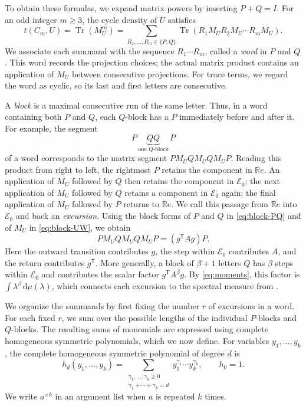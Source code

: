 \documentclass[11pt]{article}
\numberwithin{equation}{section}
\newcommand{\R}{\mathbb R}
\newcommand{\Tr}{\operatorname{Tr}}
\newcommand{\dd}{\,\mathrm d}
\newcommand{\tC}[2]{t(C_{#1},#2)}
\newcommand{\rep}[2]{#1^{\times #2}}
\begin{document}
To obtain these formulas, we expand matrix powers by inserting $P+Q=I$.
For an odd integer $m\ge3$, the cycle density of $U$ satisfies
\begin{equation}\label{eq:trace-projection-expansion}
  \tC mU=\Tr(M_U^m)
  =\sum_{R_1,\ldots,R_m\in\{P,Q\}}
    \Tr(R_1M_UR_2M_U\cdots R_mM_U).
\end{equation}
We associate each summand with the sequence $R_1\cdots R_m$, called a \emph{word} in $P$ and $Q$.
This word records the projection choices; the actual matrix product contains an application of $M_U$ between consecutive projections.
For trace terms, we regard the word as cyclic, so its last and first letters are consecutive.

A \emph{block} is a maximal consecutive run of the same letter.
Thus, in a word containing both $P$ and $Q$, each $Q$-block has a $P$ immediately before and after it.
For example, the segment
\[
  P\,\underbrace{QQ}_{\text{one $Q$-block}}\,P
\]
of a word corresponds to the matrix segment $P M_U Q M_U Q M_U P$.
Reading this product from right to left, the rightmost $P$ retains the component in $\R e$.
An application of $M_U$ followed by $Q$ then retains the component in $\mathcal E_0$; the next application of $M_U$ followed by $Q$ retains a component in $\mathcal E_0$ again; the final application of $M_U$ followed by $P$ returns to $\R e$.
We call this passage from $\R e$ into $\mathcal E_0$ and back an \emph{excursion}.
Using the block forms of $P$ and $Q$ in \eqref{eq:block-PQ} and of $M_U$ in \eqref{eq:block-UW}, we obtain
\[
  P M_U Q M_U Q M_U P=(g^{\mathsf T}Ag)P.
\]
Here the outward transition contributes $g$, the step within $\mathcal E_0$ contributes $A$, and the return contributes $g^{\mathsf T}$.
More generally, a block of $\beta+1$ letters $Q$ has $\beta$ steps within $\mathcal E_0$ and contributes the scalar factor $g^{\mathsf T}A^\beta g$.
By \eqref{eq:moments}, this factor is $\int\lambda^\beta\dd\mu(\lambda)$, which connects each excursion to the spectral measure from .

We organize the summands by first fixing the number $r$ of excursions in a word.
For each fixed $r$, we sum over the possible lengths of the individual $P$-blocks and $Q$-blocks.
The resulting sums of monomials are expressed using complete homogeneous symmetric polynomials, which we now define.
For variables $y_1,\ldots,y_k$, the complete homogeneous symmetric
polynomial of degree $d$ is
\begin{equation}\label{eq:h-def}
  h_d(y_1,\ldots,y_k)
  =\sum_{\substack{\gamma_1,\ldots,\gamma_k\ge0\\
                    \gamma_1+\cdots+\gamma_k=d}}
   y_1^{\gamma_1}\cdots y_k^{\gamma_k},
  \qquad h_0=1.
\end{equation}
We write $\rep ak$ in an argument list when $a$ is repeated $k$ times.
\end{document}
